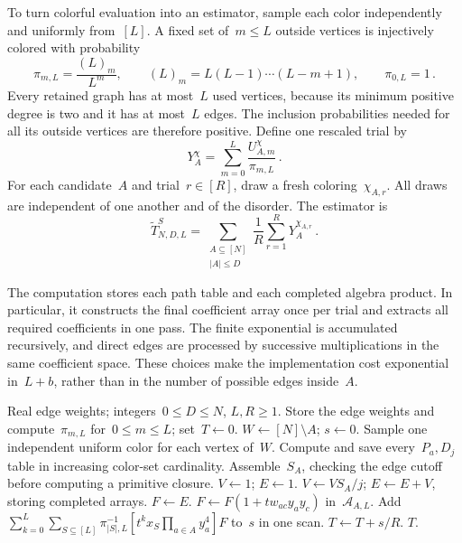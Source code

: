\documentclass[10pt]{article}
\theoremstyle{plain}
\theoremstyle{definition}
\theoremstyle{remark}
\begin{document}
To turn colorful evaluation into an estimator, sample each color independently and uniformly from~$[L]$. A fixed set of~$m\le L$ outside vertices is injectively colored with probability
\begin{equation}\label{eq:sk-color-probability}
 \pi_{m,L}=\frac{(L)_m}{L^m},\qquad (L)_m=L(L-1)\cdots(L-m+1),\qquad\pi_{0,L}=1\,.
\end{equation}
Every retained graph has at most~$L$ used vertices, because its minimum positive degree is two and it has at most~$L$ edges. The inclusion probabilities needed for all its outside vertices are therefore positive. Define one rescaled trial by
\begin{equation}\label{eq:sk-rescaled-trial}
 Y_A^\chi=\sum_{m=0}^{L}\frac{U_{A,m}^\chi}{\pi_{m,L}}\,.
\end{equation}
For each candidate~$A$ and trial~$r\in[R]$, draw a fresh coloring~$\chi_{A,r}$. All draws are independent of one another and of the disorder. The estimator is
\begin{equation}\label{eq:sk-estimator}
 \widetilde T^S_{N,D,L}=\sum_{\substack{A\subseteq[N]\\|A|\le D}}\frac1R\sum_{r=1}^{R}Y_A^{\chi_{A,r}}\,.
\end{equation}

The computation stores each path table and each completed algebra product. In particular, it constructs the final coefficient array once per trial and extracts all required coefficients in one pass. The finite exponential is accumulated recursively, and direct edges are processed by successive multiplications in the same coefficient space. These choices make the implementation cost exponential in~$L+b$, rather than in the number of possible edges inside~$A$.

\begin{algorithm}[htbp]
\caption{SK evaluation with cutoffs~$D,L$ and~$R$ trials}\label{alg:sk-estimator}
\begin{algorithmic}[1]
\Require Real edge weights; integers~$0\le D\le N$, $L,R\ge1$.
\State Store the edge weights and compute~$\pi_{m,L}$ for~$0\le m\le L$; set~$T\gets0$.
 \State $W\gets[N]\setminus A$; $s\gets0$.
  \State Sample one independent uniform color for each vertex of~$W$.
  \State Compute and save every~$P_a,D_j$ table in increasing color-set cardinality.
  \State Assemble~$S_A$, checking the edge cutoff before computing a primitive closure.
  \State $V\gets1$; $E\gets1$.
   \State $V\gets VS_A/j$; $E\gets E+V$, storing completed arrays.
  \EndFor
  \State $F\gets E$.
   \State $F\gets F(1+tw_{ac}y_ay_c)$ in~$\mathcal A_{A,L}$.
  \EndFor
  \State Add~$\displaystyle\sum_{k=0}^{L}\sum_{S\subseteq[L]}\pi_{|S|,L}^{-1}
    [t^kx_S\prod_{a\in A}y_a^4]F$ to~$s$ in one scan.
 \EndFor
 \State $T\gets T+s/R$.
\EndFor
\State \Return $T$.
\end{algorithmic}
\end{algorithm}
\end{document}
